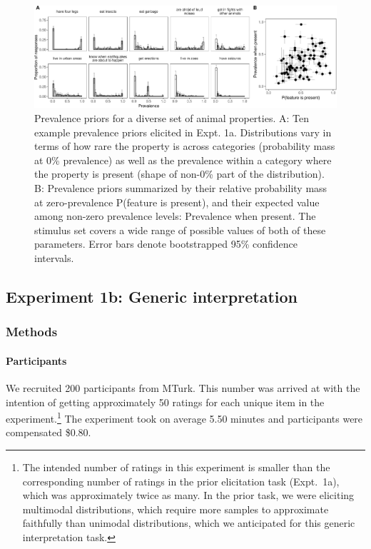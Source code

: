 \documentclass[floatsintext,doc]{apa6}
\let\oldparagraph\paragraph
\renewcommand{\paragraph}[1]{\oldparagraph{#1}\mbox{}}
\let\rmarkdownfootnote\footnote%
\def\footnote{\protect\rmarkdownfootnote}
\begin{document}
\begin{figure}
\centering
\includegraphics{genint_files/figure-latex/genInt-prevPrior-1.pdf}
\caption{\label{fig:genInt-prevPrior}Prevalence priors for a diverse set of animal properties. A: Ten example prevalence priors elicited in Expt. 1a. Distributions vary in terms of how rare the property is across categories (probability mass at 0\% prevalence) as well as the prevalence within a category where the property is present (shape of non-0\% part of the distribution). B: Prevalence priors summarized by their relative probability mass at zero-prevalence P(feature is present), and their expected value among non-zero prevalence levels: Prevalence when present. The stimulus set covers a wide range of possible values of both of these parameters. Error bars denote bootstrapped 95\% confidence intervals.}
\end{figure}

\hypertarget{experiment-1b-generic-interpretation}{%
\subsection{Experiment 1b: Generic interpretation}\label{experiment-1b-generic-interpretation}}

\hypertarget{methods-1}{%
\subsubsection{Methods}\label{methods-1}}

\hypertarget{participants-2}{%
\paragraph{Participants}\label{participants-2}}
%
We recruited 200 participants from MTurk.
This number was arrived at with the intention of getting approximately 50 ratings for each unique item in the experiment.\footnote{The intended number of ratings in this experiment is smaller than the corresponding number of ratings in the prior elicitation task (Expt.~1a), which was approximately twice as many. In the prior task, we were eliciting multimodal distributions, which require more samples  to approximate faithfully than unimodal distributions, which we anticipated for this generic interpretation task.}
The experiment took on average 5.50 minutes and participants were compensated \$0.80.
\end{document}
